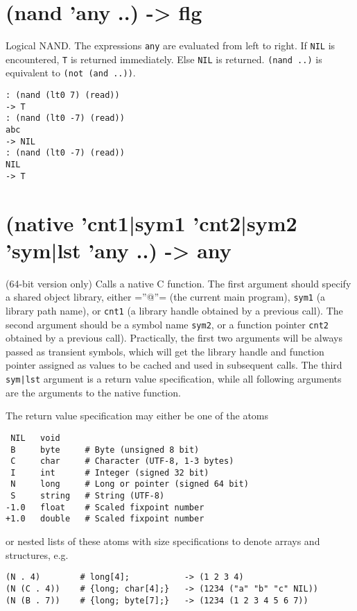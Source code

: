 {{{{{{{ 
\section{(nand 'any ..) -> flg}
\label{sec-8-1-14-7}


Logical NAND. The expressions \texttt{any} are evaluated from left to right. If
\texttt{NIL} is encountered, \texttt{T} is returned immediately. Else \texttt{NIL} is
returned. \texttt{(nand ..)} is equivalent to \texttt{(not (and ..))}.


\begin{verbatim}
: (nand (lt0 7) (read))
-> T
: (nand (lt0 -7) (read))
abc
-> NIL
: (nand (lt0 -7) (read))
NIL
-> T
\end{verbatim}

 
\section{(native 'cnt1|sym1 'cnt2|sym2 'sym|lst 'any ..) -> any}
\label{sec-8-1-14-8}


(64-bit version only) Calls a native C function. The first argument
should specify a shared object library, either =''@''= (the current main
program), \texttt{sym1} (a library path name), or \texttt{cnt1} (a library handle
obtained by a previous call). The second argument should be a symbol
name \texttt{sym2}, or a function pointer \texttt{cnt2} obtained by a previous call).
Practically, the first two arguments will be always passed as transient
symbols, which will get the library handle and function pointer assigned
as values to be cached and used in subsequent calls. The third \texttt{sym|lst}
argument is a return value specification, while all following arguments
are the arguments to the native function.

The return value specification may either be one of the atoms


\begin{verbatim}
 NIL   void
 B     byte     # Byte (unsigned 8 bit)
 C     char     # Character (UTF-8, 1-3 bytes)
 I     int      # Integer (signed 32 bit)
 N     long     # Long or pointer (signed 64 bit)
 S     string   # String (UTF-8)
-1.0   float    # Scaled fixpoint number
+1.0   double   # Scaled fixpoint number
\end{verbatim}

or nested lists of these atoms with size specifications to denote arrays
and structures, e.g.


\begin{verbatim}
(N . 4)        # long[4];           -> (1 2 3 4)
(N (C . 4))    # {long; char[4];}   -> (1234 ("a" "b" "c" NIL))
(N (B . 7))    # {long; byte[7];}   -> (1234 (1 2 3 4 5 6 7))
\end{verbatim}

}}}}}}}
